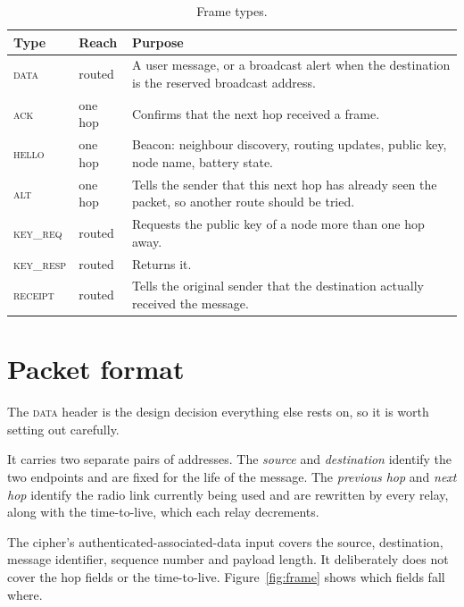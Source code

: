 \documentclass[12pt,a4paper,oneside]{report}
\begin{document}
\begin{table}[htbp]
\centering
\small
\begin{tabular}{@{}llp{7.4cm}@{}}
\toprule
Type & Reach & Purpose \\
\midrule
\textsc{data}     & routed    & A user message, or a broadcast alert when the
                                destination is the reserved broadcast address. \\
\textsc{ack}      & one hop   & Confirms that the next hop received a frame. \\
\textsc{hello}    & one hop   & Beacon: neighbour discovery, routing updates,
                                public key, node name, battery state. \\
\textsc{alt}      & one hop   & Tells the sender that this next hop has already
                                seen the packet, so another route should be tried. \\
\textsc{key\_req} & routed    & Requests the public key of a node more than one
                                hop away. \\
\textsc{key\_resp}& routed    & Returns it. \\
\textsc{receipt}  & routed    & Tells the original sender that the destination
                                actually received the message. \\
\bottomrule
\end{tabular}
\caption{Frame types.}
\label{tab:frames}
\end{table}

\section{Packet format}

The \textsc{data} header is the design decision everything else rests on, so it
is worth setting out carefully.

It carries two separate pairs of addresses. The \emph{source} and
\emph{destination} identify the two endpoints and are fixed for the life of the
message. The \emph{previous hop} and \emph{next hop} identify the radio link
currently being used and are rewritten by every relay, along with the
time-to-live, which each relay decrements.

The cipher's authenticated-associated-data input covers the source, destination,
message identifier, sequence number and payload length. It deliberately does not
cover the hop fields or the time-to-live. Figure~\ref{fig:frame} shows which
fields fall where.
\end{document}
